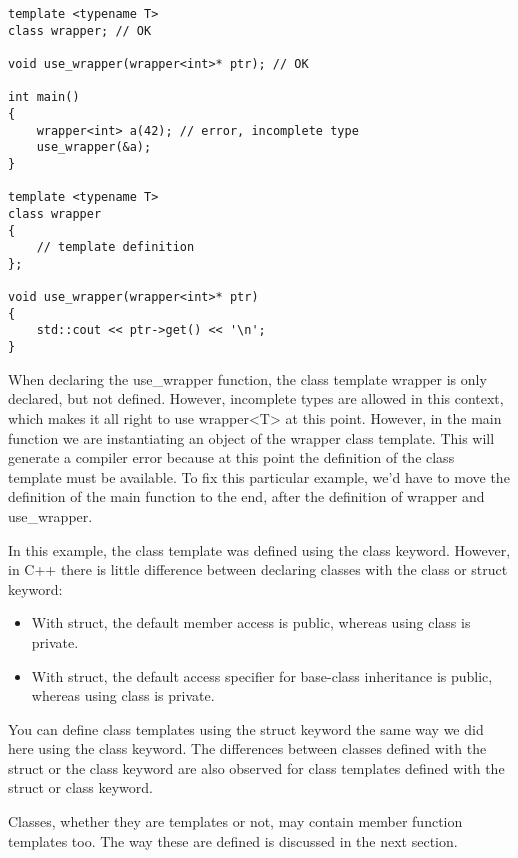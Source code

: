 \begin{lstlisting}[style=styleCXX]
template <typename T>
class wrapper; // OK

void use_wrapper(wrapper<int>* ptr); // OK

int main()
{
	wrapper<int> a(42); // error, incomplete type
	use_wrapper(&a);
}

template <typename T>
class wrapper
{
	// template definition
};

void use_wrapper(wrapper<int>* ptr)
{
	std::cout << ptr->get() << '\n';
}
\end{lstlisting}

When declaring the use\_wrapper function, the class template wrapper is only declared, but not defined. However, incomplete types are allowed in this context, which makes it all right to use wrapper<T> at this point. However, in the main function we are instantiating an object of the wrapper class template. This will generate a compiler error because at this point the definition of the class template must be available. To fix this particular example, we'd have to move the definition of the main function to the end, after the definition of wrapper and use\_wrapper.

In this example, the class template was defined using the class keyword. However, in C++ there is little difference between declaring classes with the class or struct keyword:

\begin{itemize}
\item 
With struct, the default member access is public, whereas using class is private.

\item 
With struct, the default access specifier for base-class inheritance is public, whereas using class is private.
\end{itemize}

You can define class templates using the struct keyword the same way we did here using the class keyword. The differences between classes defined with the struct or the class keyword are also observed for class templates defined with the struct or class keyword.

Classes, whether they are templates or not, may contain member function templates too. The way these are defined is discussed in the next section.

















